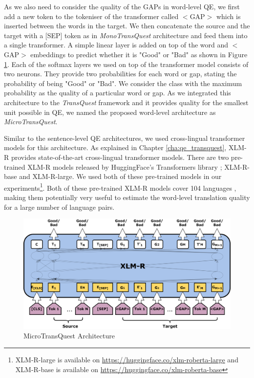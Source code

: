 As we also need to consider the quality of the GAPs in word-level QE, we first add a new token to the tokeniser of the transformer called \textsc{$<$GAP$>$} which is inserted between the words in the target. We then concatenate the source and the target with a \textsc{[SEP]} token as in \textit{MonoTransQuest} architecture and feed them into a single transformer. A simple linear layer is added on top of the word and {$<$GAP$>$} embeddings to predict whether it is "Good" or "Bad" as shown in Figure \ref{fig:word_level_architecture}. Each of the softmax layers we used on top of the transformer model consists of two neurons. They provide two probabilities for each word or gap, stating the probability of being "Good" or "Bad". We consider the class with the maximum probability as the quality of a particular word or gap. As we integrated this architecture to the \textit{TransQuest} framework and it provides quality for the smallest unit possible in QE, we named the proposed word-level architecture as \textit{MicroTransQuest}. 


Similar to the sentence-level QE architectures, we used cross-lingual transformer models for this architecture. As explained in Chapter \ref{cha:qe_transquest}, XLM-R provides state-of-the-art cross-lingual transformer models. There are two pre-trained XLM-R models released by HuggingFace's Transformers library \autocite{wolf-etal-2020-transformers}; XLM-R-base and XLM-R-large. We used both of these pre-trained models in our experiments\footnote{XLM-R-large is available on \url{https://huggingface.co/xlm-roberta-large} and XLM-R-base is available on \url{https://huggingface.co/xlm-roberta-base}}. Both of these pre-trained XLM-R models cover 104 languages \autocite{conneau-etal-2020-unsupervised}, making them potentially very useful to estimate the word-level translation quality for a large number of language pairs.

\begin{figure}
	\centering
	\includegraphics[scale=0.7]{figures/translation_quality_estimation/word_level/MicroTransQuest.png}
	\caption{MicroTransQuest Architecture}
	\label{fig:word_level_architecture}
\end{figure}

